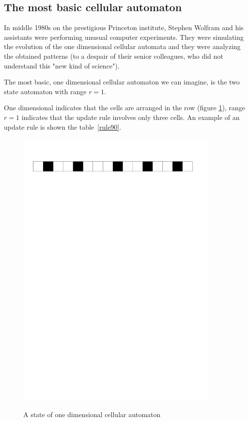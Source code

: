 \begin{enumerate}
\section{The most basic cellular automaton} 

In middle 1980s on the prestigious Princeton institute,
Stephen Wolfram and his assistants were performing unusual computer experiments. They were simulating the evolution of the one dimensional cellular automata and they were analyzing the obtained patterns \cite{levy} (to a despair of their senior colleagues, who did not understand this "new kind of science")\cite{wolfram}.

The most basic, one dimensional cellular automaton we can imagine, is the two state automaton with range $r=1$.

One dimensional indicates that the cells are arranged in the row (figure \ref{1d}), range $r=1$ indicates that the update rule involves only three cells.
An example of an update rule is shown the table~\ref{rule90}.

\begin{figure}[htbp]
 \centering 
 \includegraphics[width=0.9\textwidth]{./img/1Dline}
 \label{1d}
 \caption{A state of one dimensional cellular automaton}
\end{figure}



\end{enumerate}

